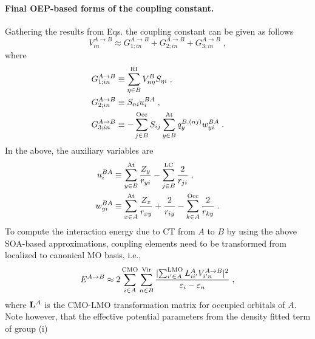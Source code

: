 \paragraph{Final OEP-based forms of the coupling constant.}
Gathering the results from Eqs. the coupling constant
can be given as follows
%
\begin{equation} \label{e:ct-murell-etal.vin.oep}
V_{in}^{A\rightarrow B} 
       \approx 
 G_{1;in}^{A\rightarrow B} 
+G_{2;in}^{A\rightarrow B} 
+G_{3;in}^{A\rightarrow B} \;,
\end{equation}
%
where
%
\begin{subequations} \label{e:ct-murrell-etal.vin.oep-gterms}
\begin{align}
 G_{1;in}^{A\rightarrow B} &\equiv \sum_{\eta\in B}^{\rm RI} V^B_{n\eta} S_{\eta i} \;, \\
 G_{2;in}^{A\rightarrow B} &\equiv S_{ni} u_i^{BA} \;, \\
 G_{3;in}^{A\rightarrow B} &\equiv
 -\sum_{j   \in B}^{\rm Occ} S_{ij}
  \sum_{y   \in B}^{\rm At} q_y^{B,(nj)} w_{yi}^{BA}
\;.
\end{align}
\end{subequations}
%
In the above, the auxiliary variables are
%
\begin{subequations}
\begin{align} \label{e:ct-murell-etal.vin.oep.aux-var}
 u_i^{BA} &\equiv    
 \sum_{y\in B}^{\rm At}
  \frac{Z_y}{ r_{yi} } 
 -
 \sum_{j\in B}^{\rm LC}
  \frac{2}{r_{ji}} 
                \;, \\
 w_{yi}^{BA} &\equiv 
   \sum_{x\in A}^{\rm At}
   \frac{Z_x}{r_{xy}}
  + \frac{2}{r_{iy}}
  - \sum_{k\in A}^{\rm Occ}
    \frac{2}{r_{ky}} 
                \;.
\end{align}
\end{subequations}
%
To compute the interaction energy due to CT from $A$ to $B$ by using the above SOA\hyp{}based
approximations, coupling elements need to be transformed from localized to canonical MO basis, i.e.,
%
\begin{equation} \label{e:ect-oep.prefinal}
 E^{A\rightarrow B} \approx 
 2 
 \sum_{i\in A}^{\rm CMO}
 \sum_{n\in B}^{\rm Vir}
 \frac{
 \lvert
   \sum_{i'\in A}^{\rm LMO} L_{ii'}^A
   V_{i'n}^{A\rightarrow B}
 \rvert^2 }{\varepsilon_i - \varepsilon_n} \;,
\end{equation}
%
where ${\bf L}^A$ is the CMO\hyp{}LMO transformation matrix for occupied orbitals of $A$. 
Note however, that the effective potential parameters from the density fitted term of group (i) 
